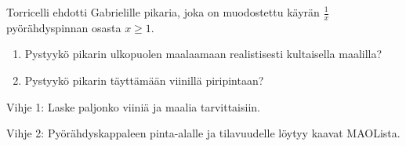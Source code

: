 Torricelli ehdotti Gabrielille pikaria, joka on muodostettu käyrän $\frac{1}{x}$ pyörähdyspinnan osasta $x \ge 1$.

\begin{enumerate}
\item Pystyykö pikarin ulkopuolen maalaamaan realistisesti kultaisella maalilla?
\item Pystyykö pikarin täyttämään viinillä piripintaan?
\end{enumerate}

Vihje 1: Laske paljonko viiniä ja maalia tarvittaisiin.


Vihje 2: Pyörähdyskappaleen pinta-alalle ja tilavuudelle löytyy kaavat MAOLista.